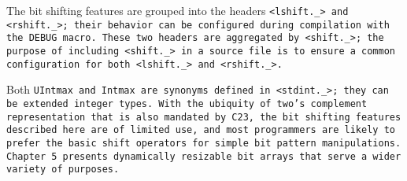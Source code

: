 The bit shifting features are grouped into the
headers \tt{<lshift._>} and \tt{<rshift._>};
their behavior can be configured during compilation with the \tt{DEBUG} macro.
These two headers are aggregated by \tt{<shift._>};
the purpose of including \tt{<shift._>} in a source file is to ensure
a common configuration for both \tt{<lshift._>} and \tt{<rshift._>}.

\note Both \tt{UIntmax} and \tt{Intmax} are synonyms defined in \tt{<stdint._>};
they can be extended integer types.
With the ubiquity of two's complement representation that is also mandated
by C23, the bit shifting features described here are of limited use,
and most programmers are likely to prefer the basic
shift operators for simple bit pattern manipulations.
Chapter 5 presents dynamically resizable bit
arrays that serve a wider variety of purposes.


